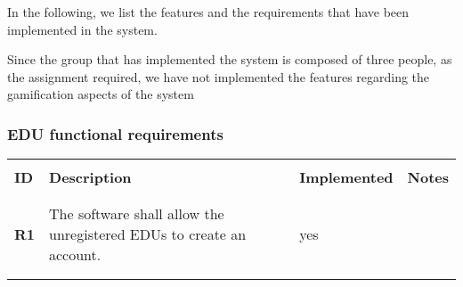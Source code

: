 In the following, we list the features and the requirements that have been implemented in the system.

Since the group that has implemented the system is composed of three people, as the assignment required, we have not implemented the features regarding the gamification aspects of the system

\subsubsection*{EDU functional requirements}
\renewcommand{\arraystretch}{0.5}
\begin{longtable}[H]{l p{6.5cm} l p{3cm}}
    \hline
                 &                                                                                                                                                                                                                                                                          &                      &                                                                                         \\
    \textbf{ID}  & \textbf{Description}                                                                                                                                                                                                                                                     & \textbf{Implemented} & \textbf{Notes}                                                                          \\
                 &                                                                                                                                                                                                                                                                          &                      &                                                                                         \\\hline & & & \\
    \textbf{R1}  & The software shall allow the unregistered EDUs to create an account.                                                                                                                                                                                                     & {\color{green}yes}   &                                                                                         \\
                 &                                                                                                                                                                                                                                                                          &                      &                                                                                         \\\hline & & & \\

\end{longtable}

